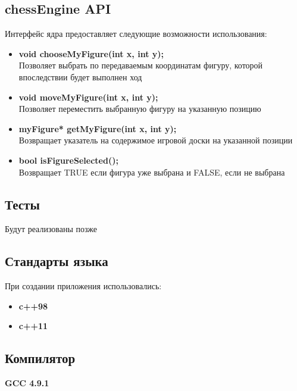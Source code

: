 \subsection*{chessEngine API}
Интерфейс ядра предоставляет следующие возможности использования:
\begin{itemize}
\item\textbf{void chooseMyFigure(int x, int y);}\\
Позволяет выбрать по передаваемым координатам  фигуру, которой впоследствии будет выполнен ход\\
\item\textbf{void moveMyFigure(int x, int y);}\\
Позволяет переместить выбранную фигуру на указанную позицию\\
\item\textbf{myFigure* getMyFigure(int x, int y);}\\
Возвращает указатель на содержимое игровой доски на указанной позиции\\
\item\textbf{bool isFigureSelected();}\\
Возвращает TRUE если фигура уже выбрана и FALSE, если не выбрана\\
\end{itemize}

\subsection*{Тесты}
Будут реализованы позже

\subsection*{Стандарты языка}
При создании приложения использовались:
\begin{itemize}
\item\textbf{c++98}\\
\item\textbf{c++11}\\
\end{itemize}

\subsection*{Компилятор}
\textbf{GCC 4.9.1}\\

